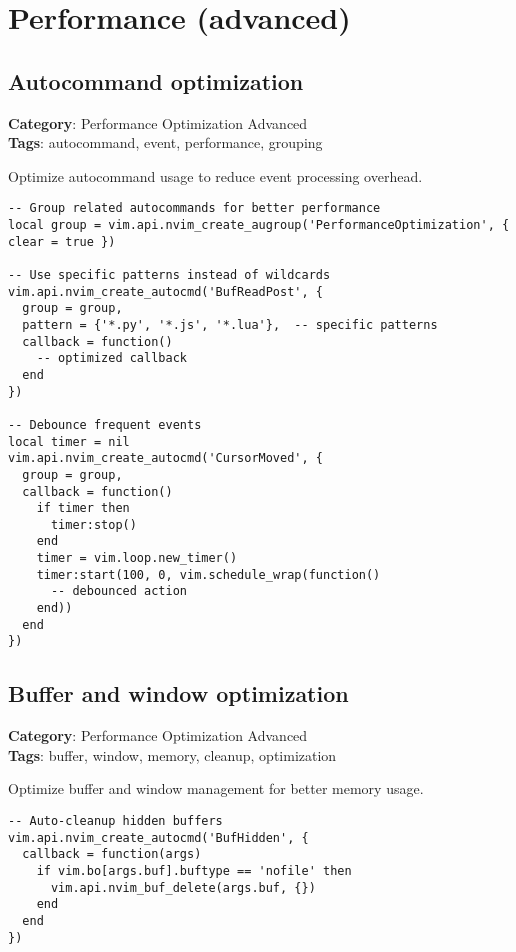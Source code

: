 {{{{{{{{{{\chapter{Performance (advanced)}
\section{Autocommand optimization}

\textbf{Category}: Performance Optimization Advanced\\ \textbf{Tags}: autocommand, event, performance, grouping
\vspace{0.5cm}

Optimize autocommand usage to reduce event processing overhead.

\begin{Exa*}{}
\begin{Verbatim}[fontsize=\footnotesize, breaklines, breakanywhere]
-- Group related autocommands for better performance
local group = vim.api.nvim_create_augroup('PerformanceOptimization', { clear = true })

-- Use specific patterns instead of wildcards
vim.api.nvim_create_autocmd('BufReadPost', {
  group = group,
  pattern = {'*.py', '*.js', '*.lua'},  -- specific patterns
  callback = function()
    -- optimized callback
  end
})

-- Debounce frequent events
local timer = nil
vim.api.nvim_create_autocmd('CursorMoved', {
  group = group,
  callback = function()
    if timer then
      timer:stop()
    end
    timer = vim.loop.new_timer()
    timer:start(100, 0, vim.schedule_wrap(function()
      -- debounced action
    end))
  end
})
\end{Verbatim}
\end{Exa*}

\section{Buffer and window optimization}

\textbf{Category}: Performance Optimization Advanced\\ \textbf{Tags}: buffer, window, memory, cleanup, optimization
\vspace{0.5cm}

Optimize buffer and window management for better memory usage.

\begin{Exa*}{}
\begin{Verbatim}[fontsize=\footnotesize, breaklines, breakanywhere]
-- Auto-cleanup hidden buffers
vim.api.nvim_create_autocmd('BufHidden', {
  callback = function(args)
    if vim.bo[args.buf].buftype == 'nofile' then
      vim.api.nvim_buf_delete(args.buf, {})
    end
  end
})


\end{Verbatim}
\end{Exa*}}}}}}}}}}}
